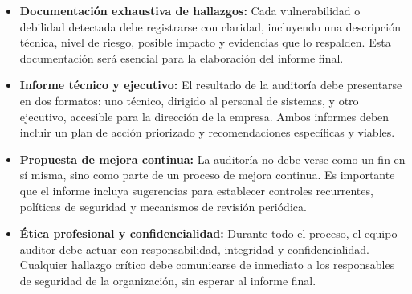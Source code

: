 \documentclass[a4paper, 10pt]{article}
\begin{document}
\begin{itemize}
        \item \textbf{Documentación exhaustiva de hallazgos:}  
        Cada vulnerabilidad o debilidad detectada debe registrarse con claridad, incluyendo una descripción técnica, nivel de riesgo, posible impacto y evidencias que lo respalden. Esta documentación será esencial para la elaboración del informe final.
    
        \item \textbf{Informe técnico y ejecutivo:}  
        El resultado de la auditoría debe presentarse en dos formatos: uno técnico, dirigido al personal de sistemas, y otro ejecutivo, accesible para la dirección de la empresa. Ambos informes deben incluir un plan de acción priorizado y recomendaciones específicas y viables.
    
        \item \textbf{Propuesta de mejora continua:}  
        La auditoría no debe verse como un fin en sí misma, sino como parte de un proceso de mejora continua. Es importante que el informe incluya sugerencias para establecer controles recurrentes, políticas de seguridad y mecanismos de revisión periódica.
    
        \item \textbf{Ética profesional y confidencialidad:}  
        Durante todo el proceso, el equipo auditor debe actuar con responsabilidad, integridad y confidencialidad. Cualquier hallazgo crítico debe comunicarse de inmediato a los responsables de seguridad de la organización, sin esperar al informe final.
    
    \end{itemize}
    
 
    \clearpage
    
    
    
\end{document}
